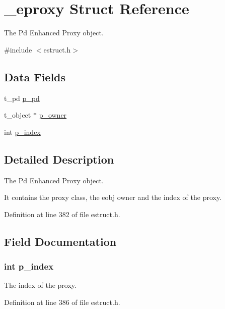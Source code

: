 \hypertarget{struct__eproxy}{\section{\-\_\-eproxy Struct Reference}
\label{struct__eproxy}
}


The Pd Enhanced Proxy object.  




{\ttfamily \#include $<$estruct.\-h$>$}

\subsection*{Data Fields}
\begin{DoxyCompactItemize}
\item 
t\-\_\-pd \hyperlink{struct__eproxy_a818a512bafab5b368d1fa0bca9872451}{p\-\_\-pd}
\item 
t\-\_\-object $\ast$ \hyperlink{struct__eproxy_aafbddf848d70a14ab336be2b19cc535f}{p\-\_\-owner}
\item 
int \hyperlink{struct__eproxy_adf4f65c8db21f49ab60d62fedcfa9192}{p\-\_\-index}
\end{DoxyCompactItemize}


\subsection{Detailed Description}
The Pd Enhanced Proxy object. 

It contains the proxy class, the eobj owner and the index of the proxy. 

Definition at line 382 of file estruct.\-h.



\subsection{Field Documentation}
\hypertarget{struct__eproxy_adf4f65c8db21f49ab60d62fedcfa9192}{
\subsubsection[{p\-\_\-index}]{\setlength{\rightskip}{0pt plus 5cm}int p\-\_\-index}}\label{struct__eproxy_adf4f65c8db21f49ab60d62fedcfa9192}
The index of the proxy. 

Definition at line 386 of file estruct.\-h.

